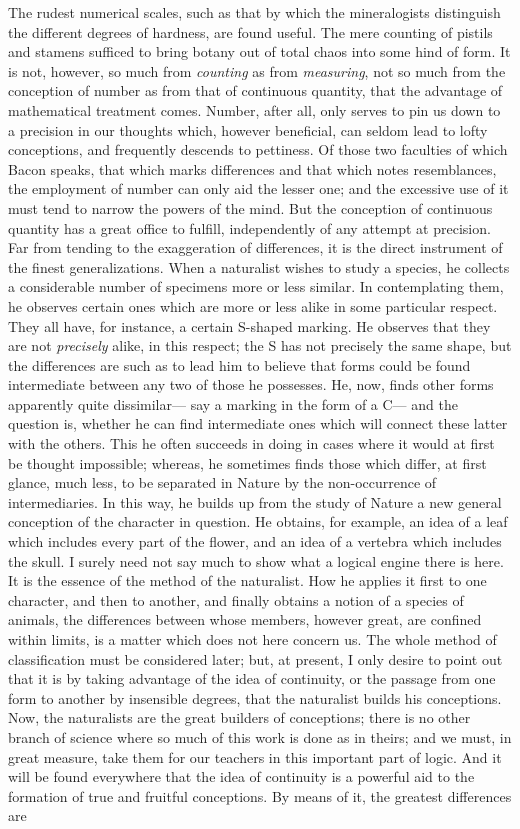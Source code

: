 The rudest numerical scales, such as that by which the mineralogists distinguish the different degrees of hardness, are found useful. The mere counting of pistils and stamens sufficed to bring botany out of total chaos into some hind of form. It is not, however, so much from \emph{counting} as from \emph{measuring}, not so much from the conception of number as from that of continuous quantity, that the advantage of mathematical treatment comes. Number, after all, only serves to pin us down to a precision in our thoughts which, however beneficial, can seldom lead to lofty conceptions, and frequently descends to pettiness. Of those two faculties of which Bacon speaks, that which marks differences and that which notes resemblances, the employment of number can only aid the lesser one; and the excessive use of it must tend to narrow the powers of the mind. But the conception of continuous quantity has a great office to fulfill, independently of any attempt at precision. Far from tending to the exaggeration of differences, it is the direct instrument of the finest generalizations. When a naturalist wishes to study a species, he collects a considerable number of specimens more or less similar. In contemplating them, he observes certain ones which are more or less alike in some particular respect. They all have, for instance, a certain S-shaped marking. He observes that they are not \emph{precisely} alike, in this respect; the S has not precisely the same shape, but the differences are such as to lead him to believe that forms could be found intermediate between any two of those he possesses. He, now, finds other forms apparently quite dissimilar--- say a marking in the form of a C--- and the question is, whether he can find intermediate ones which will connect these latter with the others. This he often succeeds in doing in cases where it would at first be thought impossible; whereas, he sometimes finds those which differ, at first glance, much less, to be separated in Nature by the non-occurrence of intermediaries. In this way, he builds up from the study of Nature a new general conception of the character in question. He obtains, for example, an idea of a leaf which includes every part of the flower, and an idea of a vertebra which includes the skull. I surely need not say much to show what a logical engine there is here. It is the essence of the method of the naturalist. How he applies it first to one character, and then to another, and finally obtains a notion of a species of animals, the differences between whose members, however great, are confined within limits, is a matter which does not here concern us. The whole method of classification must be considered later; but, at present, I only desire to point out that it is by taking advantage of the idea of continuity, or the passage from one form to another by insensible degrees, that the naturalist builds his conceptions. Now, the naturalists are the great builders of conceptions; there is no other branch of science where so much of this work is done as in theirs; and we must, in great measure, take them for our teachers in this important part of logic. And it will be found everywhere that the idea of continuity is a powerful aid to the formation of true and fruitful conceptions. By means of it, the greatest differences are 